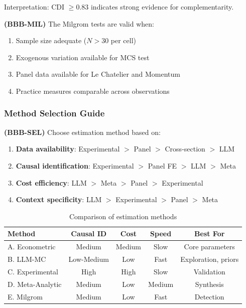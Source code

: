 Interpretation: CDI $\geq 0.83$ indicates strong evidence for complementarity.

\begin{axiom}
\label{ax:bbb-mil}
\textbf{(BBB-MIL)} The Milgrom tests are valid when:
\begin{enumerate}
    \item Sample size adequate ($N > 30$ per cell)
    \item Exogenous variation available for MCS test
    \item Panel data available for Le Chatelier and Momentum
    \item Practice measures comparable across observations
\end{enumerate}
\end{axiom}

\subsubsection{Method Selection Guide}

\begin{axiom}
\label{ax:bbb-method}
\textbf{(BBB-SEL)} Choose estimation method based on:
\begin{enumerate}
    \item \textbf{Data availability}: Experimental $>$ Panel $>$ Cross-section $>$ LLM
    \item \textbf{Causal identification}: Experimental $>$ Panel FE $>$ LLM $>$ Meta
    \item \textbf{Cost efficiency}: LLM $>$ Meta $>$ Panel $>$ Experimental
    \item \textbf{Context specificity}: LLM $>$ Experimental $>$ Panel $>$ Meta
\end{enumerate}
\end{axiom}

\begin{table}[h]
\centering
\small
\begin{tabular}{lcccc}
\toprule
\textbf{Method} & \textbf{Causal ID} & \textbf{Cost} & \textbf{Speed} & \textbf{Best For} \\
\midrule
A. Econometric & Medium & Medium & Slow & Core parameters \\
B. LLM-MC & Low-Medium & Low & Fast & Exploration, priors \\
C. Experimental & High & High & Slow & Validation \\
D. Meta-Analytic & Medium & Low & Medium & Synthesis \\
E. Milgrom & Medium & Low & Fast & Detection \\
\bottomrule
\end{tabular}
\caption{Comparison of estimation methods}
\label{tab:method-comparison}
\end{table}


